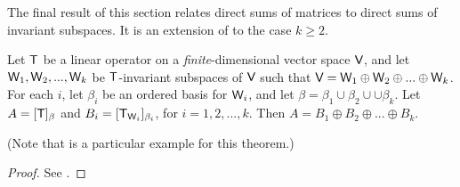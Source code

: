 The final result of this section relates direct sums of matrices to direct sums of invariant subspaces.
It is an extension of  to the case \(k \ge 2\).

\begin{theorem} \label{thm 5.24}
Let \(\textsf{T}\) be a linear operator on a \emph{finite}-dimensional vector space \(\textsf{V}\), and let \(\textsf{W}_1, \textsf{W}_2, ..., \textsf{W}_k\) be \(\textsf{T}\)-invariant subspaces of \(\textsf{V}\) such that \(\textsf{V} = \textsf{W}_1 \oplus \textsf{W}_2 \oplus ... \oplus \textsf{W}_k\).
For each \(i\), let \(\beta_i\) be an ordered basis for \(\textsf{W}_i\), and let \(\beta = \beta_1 \cup \beta_2 \cup \cup \beta_k\). Let \(A = [\textsf{T}]_{\beta}\) and \(B_i = [\textsf{T}_{\textsf{W}_i}]_{\beta_i}\), for \(i = 1, 2, ..., k\).
Then \(A = B_1 \oplus B_2 \oplus ... \oplus B_k\).

(Note that  is a particular example for this theorem.)
\end{theorem}

\begin{proof}
See .
\end{proof}
